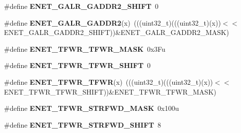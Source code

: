 \begin{DoxyCompactItemize}
\item 
\#define {\bfseries E\+N\+E\+T\+\_\+\+G\+A\+L\+R\+\_\+\+G\+A\+D\+D\+R2\+\_\+\+S\+H\+I\+FT}~0\hypertarget{group__ENET__Register__Masks_ga972b44abee90b40667709db22c6263a1}{}\label{group__ENET__Register__Masks_ga972b44abee90b40667709db22c6263a1}

\item 
\#define {\bfseries E\+N\+E\+T\+\_\+\+G\+A\+L\+R\+\_\+\+G\+A\+D\+D\+R2}(x)~(((uint32\+\_\+t)(((uint32\+\_\+t)(x))$<$$<$E\+N\+E\+T\+\_\+\+G\+A\+L\+R\+\_\+\+G\+A\+D\+D\+R2\+\_\+\+S\+H\+I\+FT))\&E\+N\+E\+T\+\_\+\+G\+A\+L\+R\+\_\+\+G\+A\+D\+D\+R2\+\_\+\+M\+A\+SK)\hypertarget{group__ENET__Register__Masks_gac34b31c0ced54db9a6d54a2ba5151cad}{}\label{group__ENET__Register__Masks_gac34b31c0ced54db9a6d54a2ba5151cad}

\item 
\#define {\bfseries E\+N\+E\+T\+\_\+\+T\+F\+W\+R\+\_\+\+T\+F\+W\+R\+\_\+\+M\+A\+SK}~0x3\+Fu\hypertarget{group__ENET__Register__Masks_gabf947dfd1da7311bb46602d7415a343d}{}\label{group__ENET__Register__Masks_gabf947dfd1da7311bb46602d7415a343d}

\item 
\#define {\bfseries E\+N\+E\+T\+\_\+\+T\+F\+W\+R\+\_\+\+T\+F\+W\+R\+\_\+\+S\+H\+I\+FT}~0\hypertarget{group__ENET__Register__Masks_ga20649e66e27490be23302b4c87e979b8}{}\label{group__ENET__Register__Masks_ga20649e66e27490be23302b4c87e979b8}

\item 
\#define {\bfseries E\+N\+E\+T\+\_\+\+T\+F\+W\+R\+\_\+\+T\+F\+WR}(x)~(((uint32\+\_\+t)(((uint32\+\_\+t)(x))$<$$<$E\+N\+E\+T\+\_\+\+T\+F\+W\+R\+\_\+\+T\+F\+W\+R\+\_\+\+S\+H\+I\+FT))\&E\+N\+E\+T\+\_\+\+T\+F\+W\+R\+\_\+\+T\+F\+W\+R\+\_\+\+M\+A\+SK)\hypertarget{group__ENET__Register__Masks_ga577c730841ebdcb31dad8bf4a8d864bb}{}\label{group__ENET__Register__Masks_ga577c730841ebdcb31dad8bf4a8d864bb}

\item 
\#define {\bfseries E\+N\+E\+T\+\_\+\+T\+F\+W\+R\+\_\+\+S\+T\+R\+F\+W\+D\+\_\+\+M\+A\+SK}~0x100u\hypertarget{group__ENET__Register__Masks_gafbad9065556d81ffdbabd31915eb15b9}{}\label{group__ENET__Register__Masks_gafbad9065556d81ffdbabd31915eb15b9}

\item 
\#define {\bfseries E\+N\+E\+T\+\_\+\+T\+F\+W\+R\+\_\+\+S\+T\+R\+F\+W\+D\+\_\+\+S\+H\+I\+FT}~8\hypertarget{group__ENET__Register__Masks_ga4b3c1b7265098b5395df3ed3679058a0}{}\label{group__ENET__Register__Masks_ga4b3c1b7265098b5395df3ed3679058a0}


\end{DoxyCompactItemize}
